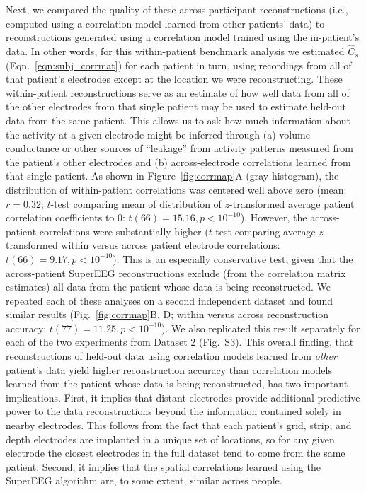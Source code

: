 \documentclass[11pt]{article}
\newcommand{\splitexpcorrmaps}{S3}
\begin{document}
Next, we compared the quality of these across-participant reconstructions (i.e.,
computed using a correlation model learned from other patients' data) to
reconstructions generated using a correlation model trained using the
in-patient's data.  In other words, for this within-patient benchmark analysis
we estimated $\hat{C}_{s}$ (Eqn.~\ref{eqn:subj_corrmat}) for each patient in
turn, using recordings from all of that patient's electrodes except at the
location we were reconstructing.  These within-patient reconstructions serve as
an estimate of how well data from all of the other electrodes from that single
patient may be used to estimate held-out data from the same patient.  This
allows us to ask how much information about the activity at a given electrode
might be inferred through (a) volume conductance or other sources of ``leakage''
from activity patterns measured from the patient's other electrodes and (b)
across-electrode correlations learned from that single patient.  As shown in
Figure~\ref{fig:corrmap}A (gray histogram), the distribution of within-patient
correlations was centered well above zero (mean: $r = 0.32$; $t$-test comparing
mean of distribution of $z$-transformed average patient correlation coefficients
to 0: $t(66) = 15.16, p < 10^{-10}$). However, the across-patient correlations
were substantially higher ($t$-test comparing average $z$-transformed within
versus across patient electrode correlations: $t(66) = 9.17, p < 10^{-10}$).
This is an especially conservative test, given that the across-patient SuperEEG
reconstructions exclude (from the correlation matrix estimates) all data from
the patient whose data is being reconstructed.  We repeated each of these
analyses on a second independent dataset and found similar results
(Fig.~\ref{fig:corrmap}B, D; within versus across reconstruction accuracy:
$t(77) = 11.25, p < 10^{-10}$). We also replicated this result separately for
each of the two experiments from Dataset 2 (Fig.~\splitexpcorrmaps).  This overall
finding, that reconstructions of held-out data using correlation models learned
from \textit{other} patient's data yield higher reconstruction accuracy than
correlation models learned from the patient whose data is being reconstructed,
has two important implications.  First, it implies that distant electrodes
provide additional predictive power to the data reconstructions beyond the
information contained solely in nearby electrodes.  This follows from the fact
that each patient's grid, strip, and depth electrodes are implanted in a unique
set of locations, so for any given electrode the closest electrodes in the full
dataset tend to come from the same patient.  Second, it implies that the
spatial correlations learned using the SuperEEG algorithm are, to some extent,
similar across people.
\end{document}
